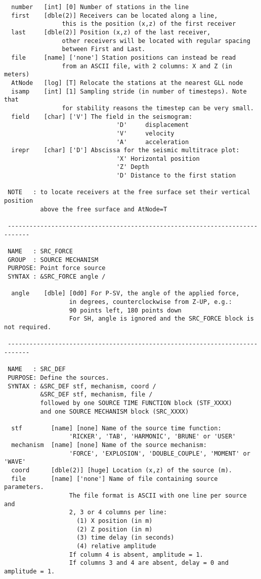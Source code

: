 \begin{verbatim}
  number   [int] [0] Number of stations in the line
  first    [dble(2)] Receivers can be located along a line,
                this is the position (x,z) of the first receiver
  last     [dble(2)] Position (x,z) of the last receiver,
                other receivers will be located with regular spacing
                between First and Last.
  file     [name] ['none'] Station positions can instead be read 
                from an ASCII file, with 2 columns: X and Z (in meters)
  AtNode   [log] [T] Relocate the stations at the nearest GLL node
  isamp    [int] [1] Sampling stride (in number of timesteps). Note that
                for stability reasons the timestep can be very small.
  field    [char] ['V'] The field in the seismogram:
                               'D'     displacement
                               'V'     velocity
                               'A'     acceleration
  irepr    [char] ['D'] Abscissa for the seismic multitrace plot:
                               'X' Horizontal position
                               'Z' Depth
                               'D' Distance to the first station

 NOTE   : to locate receivers at the free surface set their vertical position 
          above the free surface and AtNode=T

 ----------------------------------------------------------------------------

 NAME   : SRC_FORCE
 GROUP  : SOURCE MECHANISM
 PURPOSE: Point force source
 SYNTAX : &SRC_FORCE angle /

  angle    [dble] [0d0]	For P-SV, the angle of the applied force, 
                  in degrees, counterclockwise from Z-UP, e.g.: 
                  90 points left, 180 points down
                  For SH, angle is ignored and the SRC_FORCE block is not required.

 ----------------------------------------------------------------------------

 NAME   : SRC_DEF
 PURPOSE: Define the sources.
 SYNTAX : &SRC_DEF stf, mechanism, coord /
          &SRC_DEF stf, mechanism, file /
          followed by one SOURCE TIME FUNCTION block (STF_XXXX)
          and one SOURCE MECHANISM block (SRC_XXXX) 

  stf        [name] [none] Name of the source time function:
                  'RICKER', 'TAB', 'HARMONIC', 'BRUNE' or 'USER'
  mechanism  [name] [none] Name of the source mechanism:
                  'FORCE', 'EXPLOSION', 'DOUBLE_COUPLE', 'MOMENT' or 'WAVE'
  coord      [dble(2)] [huge] Location (x,z) of the source (m). 
  file       [name] ['none'] Name of file containing source parameters.
                  The file format is ASCII with one line per source and
                  2, 3 or 4 columns per line:
                    (1) X position (in m)
                    (2) Z position (in m)
                    (3) time delay (in seconds)
                    (4) relative amplitude
                  If column 4 is absent, amplitude = 1.
                  If columns 3 and 4 are absent, delay = 0 and amplitude = 1.


\end{verbatim}
